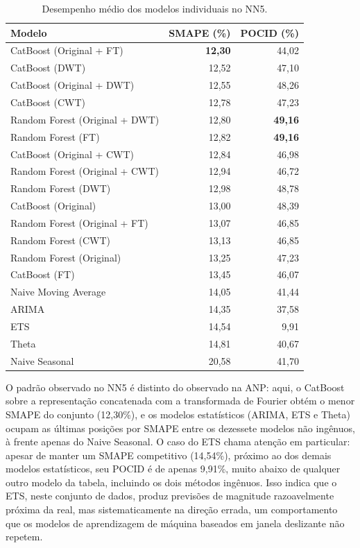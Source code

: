 \begin{table}[H]
\centering
\caption{Desempenho médio dos modelos individuais no NN5.}
\label{tab:nn5-individual}
\begin{tabular}{@{}lrr@{}}
\toprule
\textbf{Modelo} & \textbf{SMAPE (\%)} & \textbf{POCID (\%)} \\
\midrule
CatBoost (Original + FT)             & \textbf{12,30} & 44,02 \\
CatBoost (DWT)                       & 12,52 & 47,10 \\
CatBoost (Original + DWT)            & 12,55 & 48,26 \\
CatBoost (CWT)                       & 12,78 & 47,23 \\
Random Forest (Original + DWT)       & 12,80 & \textbf{49,16} \\
Random Forest (FT)                   & 12,82 & \textbf{49,16} \\
CatBoost (Original + CWT)            & 12,84 & 46,98 \\
Random Forest (Original + CWT)       & 12,94 & 46,72 \\
Random Forest (DWT)                  & 12,98 & 48,78 \\
CatBoost (Original)                  & 13,00 & 48,39 \\
Random Forest (Original + FT)        & 13,07 & 46,85 \\
Random Forest (CWT)                  & 13,13 & 46,85 \\
Random Forest (Original)             & 13,25 & 47,23 \\
CatBoost (FT)                        & 13,45 & 46,07 \\
Naive Moving Average                 & 14,05 & 41,44 \\
ARIMA                                & 14,35 & 37,58 \\
ETS                                  & 14,54 & 9,91 \\
Theta                                & 14,81 & 40,67 \\
Naive Seasonal                       & 20,58 & 41,70 \\
\bottomrule
\end{tabular}
\end{table}

O padrão observado no NN5 é distinto do observado na ANP: aqui, o CatBoost sobre a representação concatenada com a transformada de Fourier obtém o menor SMAPE do conjunto (12,30\%), e os modelos estatísticos (ARIMA, ETS e Theta) ocupam as últimas posições por SMAPE entre os dezessete modelos não ingênuos, à frente apenas do Naive Seasonal. O caso do ETS chama atenção em particular: apesar de manter um SMAPE competitivo (14,54\%), próximo ao dos demais modelos estatísticos, seu POCID é de apenas 9,91\%, muito abaixo de qualquer outro modelo da tabela, incluindo os dois métodos ingênuos. Isso indica que o ETS, neste conjunto de dados, produz previsões de magnitude razoavelmente próxima da real, mas sistematicamente na direção errada, um comportamento que os modelos de aprendizagem de máquina baseados em janela deslizante não repetem.


